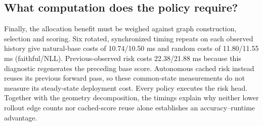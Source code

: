 \subsection{What computation does the policy require?}
Finally, the allocation benefit must be weighed against graph construction, selection and scoring. Six rotated, synchronized timing repeats on each observed history give natural-base costs of 10.74/10.50 ms and random costs of 11.80/11.55 ms (faithful/NLL). Previous-observed risk costs 22.38/21.88 ms because this diagnostic regenerates the preceding base score. Autonomous cached risk instead reuses its previous forward pass, so these common-state measurements do not measure its steady-state deployment cost. Every policy executes the risk head. Together with the geometry decomposition, the timings explain why neither lower rollout edge counts nor cached-score reuse alone establishes an accuracy--runtime advantage.

